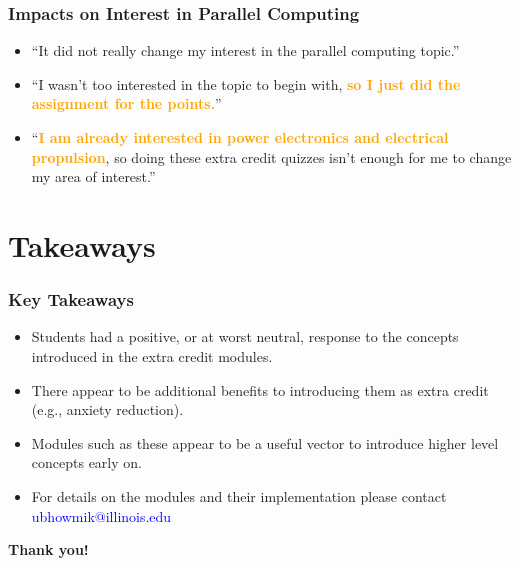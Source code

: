 \documentclass{beamer}
\begin{document}
\begin{frame}
    \frametitle{Impacts on Interest in Parallel Computing}

    \begin{figure}
      
    \end{figure}

    \vfill
    \begin{itemize}
        \item ``It did not really change my interest in the parallel computing topic.'' \\ \vspace{0.25cm} 
        \item ``I wasn't too interested in the topic to begin with, \textcolor{orange}{\textbf{so I just did the assignment for the points.}}''\\ \vspace{0.25cm}
        \item ``\textcolor{orange}{\textbf{I am already interested in power electronics and electrical propulsion}}, so doing these extra credit quizzes isn't enough for me to change my area of interest.''
    \end{itemize}

\end{frame}

\section{Takeaways}

\begin{frame}
    \frametitle{Key Takeaways}

    \begin{itemize}
      \item Students had a positive, or at worst neutral, response to the concepts introduced in the extra credit modules.
      \item There appear to be additional benefits to introducing them as extra credit (e.g., anxiety reduction).
      \item Modules such as these appear to be a useful vector to introduce higher level concepts early on.
      \item For details on the modules and their implementation please contact \textcolor{blue}{ubhowmik@illinois.edu}
    \end{itemize}
    \vfill
      \begin{centered}
          \textbf{\Large Thank you!}
      \end{centered}
\end{frame}
\end{document}
